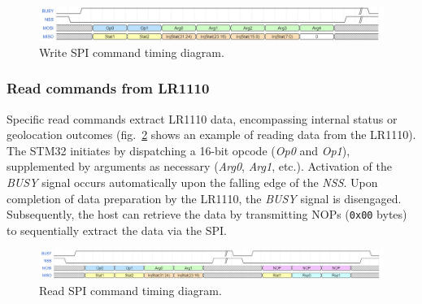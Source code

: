 \begin{figure}[H]
    \centering
    \includegraphics[width=1\textwidth]{figures/write_command.png}
    \caption{Write SPI command timing diagram.}
    \label{fig:write_command}
\end{figure}

\subsubsection{Read commands from LR1110}
Specific read commands extract LR1110 data, encompassing internal status or geolocation outcomes (fig.~\ref{fig:read_command} shows an example of reading data from the LR1110). The STM32 initiates by dispatching a 16-bit opcode (\textit{Op0} and \textit{Op1}), supplemented by arguments as necessary (\textit{Arg0}, \textit{Arg1}, etc.). Activation of the \textit{BUSY} signal occurs automatically upon the falling edge of the \textit{NSS}. Upon completion of data preparation by the LR1110, the \textit{BUSY} signal is disengaged. Subsequently, the host can retrieve the data by transmitting NOPs (\texttt{0x00} bytes) to sequentially extract the data via the \ac{SPI}.

\begin{figure}[H]
    \centering
    \includegraphics[width=1\textwidth]{figures/read_command.png}
    \caption{Read SPI command timing diagram.}
    \label{fig:read_command}
\end{figure}

